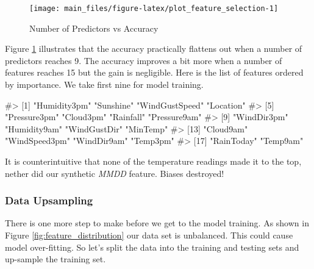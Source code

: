 \begin{Schunk}
\begin{figure}[H]

{\centering \texttt{[image: main\_files/figure-latex/plot\_feature\_selection-1]} 

}

\caption[Number of Predictors vs Accuracy]{Number of Predictors vs Accuracy}\label{fig:plot_feature_selection}
\end{figure}
\end{Schunk}

Figure \ref{fig:plot_feature_selection} illustrates that the accuracy
practically flattens out when a number of predictors reaches 9. The
accuracy improves a bit more when a number of features reaches 15 but
the gain is negligible. Here is the list of features ordered by
importance. We take first nine for model training.

\begin{Schunk}
\begin{Soutput}
#>  [1] "Humidity3pm"   "Sunshine"      "WindGustSpeed" "Location"     
#>  [5] "Pressure3pm"   "Cloud3pm"      "Rainfall"      "Pressure9am"  
#>  [9] "WindDir3pm"    "Humidity9am"   "WindGustDir"   "MinTemp"      
#> [13] "Cloud9am"      "WindSpeed3pm"  "WindDir9am"    "Temp3pm"      
#> [17] "RainToday"     "Temp9am"
\end{Soutput}
\end{Schunk}

It is counterintuitive that none of the temperature readings made it to
the top, nether did our synthetic \emph{MMDD} feature. Biases destroyed!

\hypertarget{data-upsampling}{%
\subsubsection{Data Upsampling}\label{data-upsampling}}

There is one more step to make before we get to the model training. As
shown in Figure \ref{fig:feature_distribution} our data set is
unbalanced. This could cause model over-fitting. So let's split the data
into the training and testing sets and up-sample the training set.

